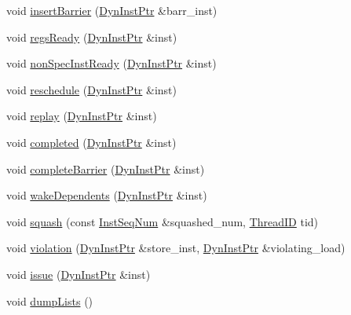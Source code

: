 \begin{DoxyCompactItemize}
void \hyperlink{classMemDepUnit_ae556f19566bae9c4f55350eab17abacd}{insertBarrier} (\hyperlink{classRefCountingPtr}{DynInstPtr} \&barr\_\-inst)
\item 
void \hyperlink{classMemDepUnit_a386af6dbeff30f5152fd5dc076143ff6}{regsReady} (\hyperlink{classRefCountingPtr}{DynInstPtr} \&inst)
\item 
void \hyperlink{classMemDepUnit_aa85e9b95e406478a19cb070b13b89c85}{nonSpecInstReady} (\hyperlink{classRefCountingPtr}{DynInstPtr} \&inst)
\item 
void \hyperlink{classMemDepUnit_a6a8d5eec636c2815cb1bc7ca3c467412}{reschedule} (\hyperlink{classRefCountingPtr}{DynInstPtr} \&inst)
\item 
void \hyperlink{classMemDepUnit_ace9b968c62d08a19c21a17b57bfb52fe}{replay} (\hyperlink{classRefCountingPtr}{DynInstPtr} \&inst)
\item 
void \hyperlink{classMemDepUnit_a4970c417e5fac50b9a28caea195717c3}{completed} (\hyperlink{classRefCountingPtr}{DynInstPtr} \&inst)
\item 
void \hyperlink{classMemDepUnit_a9debd021c4b533f5bbd174890037d2dd}{completeBarrier} (\hyperlink{classRefCountingPtr}{DynInstPtr} \&inst)
\item 
void \hyperlink{classMemDepUnit_a84834d31005dcede47e334bfee5b52d3}{wakeDependents} (\hyperlink{classRefCountingPtr}{DynInstPtr} \&inst)
\item 
void \hyperlink{classMemDepUnit_a74283dfde2ab06c84e10bd85000c168b}{squash} (const \hyperlink{inst__seq_8hh_a258d93d98edaedee089435c19ea2ea2e}{InstSeqNum} \&squashed\_\-num, \hyperlink{base_2types_8hh_ab39b1a4f9dad884694c7a74ed69e6a6b}{ThreadID} tid)
\item 
void \hyperlink{classMemDepUnit_aac3ab1b2d6cc44bd1e7c42bf39538316}{violation} (\hyperlink{classRefCountingPtr}{DynInstPtr} \&store\_\-inst, \hyperlink{classRefCountingPtr}{DynInstPtr} \&violating\_\-load)
\item 
void \hyperlink{classMemDepUnit_a6abd0e2390123c2fe82ab377b76b5347}{issue} (\hyperlink{classRefCountingPtr}{DynInstPtr} \&inst)
\item 
void \hyperlink{classMemDepUnit_a3d1dae45e8e0b5cf7c1f4f8c796d070e}{dumpLists} ()
\end{DoxyCompactItemize}
